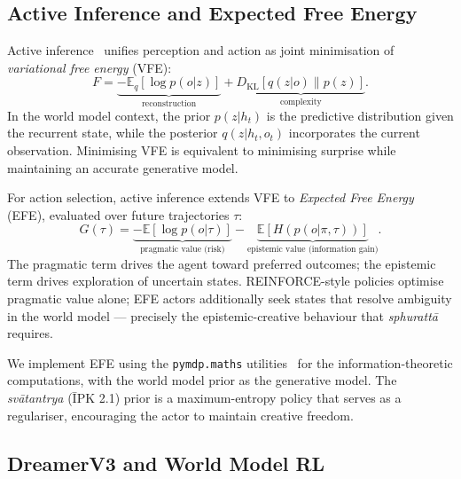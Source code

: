 \documentclass[journal,onecolumn,11pt]{IEEEtran}
\begin{document}
\subsection{Active Inference and Expected Free Energy}

Active inference~\cite{friston2017active} unifies perception and action as
joint minimisation of \emph{variational free energy} (VFE):
%
\begin{equation}
  F = \underbrace{-\mathbb{E}_{q}[\log p(o|z)]}_{\text{reconstruction}}
      + \underbrace{D_{\text{KL}}[q(z|o) \| p(z)]}_{\text{complexity}}.
\end{equation}
%
In the world model context, the prior $p(z|h_t)$ is the predictive
distribution given the recurrent state, while the posterior $q(z|h_t,o_t)$
incorporates the current observation.
Minimising VFE is equivalent to minimising surprise while maintaining an
accurate generative model.

For action selection, active inference extends VFE to \emph{Expected Free Energy}
(EFE), evaluated over future trajectories $\tau$:
%
\begin{equation}
  G(\tau) = \underbrace{-\mathbb{E}[\log p(o|\tau)]}_{\text{pragmatic value
  (risk)}}
            - \underbrace{\mathbb{E}[H(p(o|\pi,\tau))]}_{\text{epistemic value
  (information gain)}}.
  \label{eq:efe}
\end{equation}
%
The pragmatic term drives the agent toward preferred outcomes; the epistemic
term drives exploration of uncertain states.
REINFORCE-style policies optimise pragmatic value alone; EFE actors additionally
seek states that resolve ambiguity in the world model — precisely the
epistemic-creative behaviour that \emph{sphurattā} requires.

We implement EFE using the \texttt{pymdp.maths} utilities~\cite{heins2022pymdp}
for the information-theoretic computations, with the world model prior as
the generative model.
The \emph{svātantrya} (ĪPK 2.1) prior is a maximum-entropy policy that
serves as a regulariser, encouraging the actor to maintain creative freedom.

\subsection{DreamerV3 and World Model RL}
\end{document}
